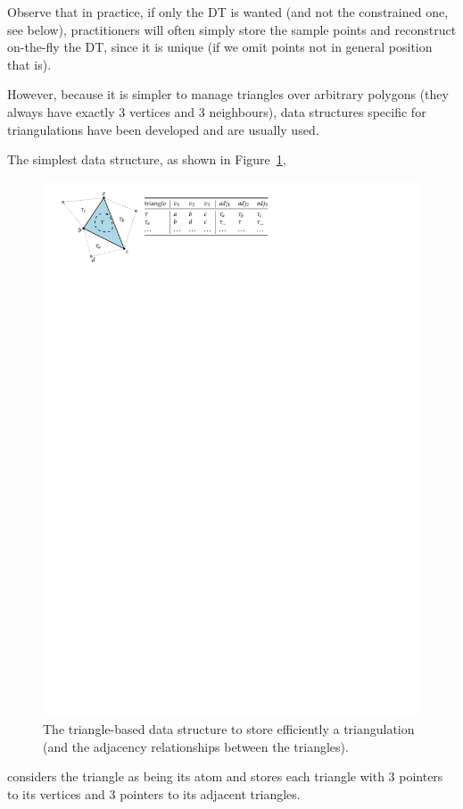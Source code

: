 Observe that in practice, if only the DT is wanted (and not the constrained one, see below), practitioners will often simply store the sample points and reconstruct on-the-fly the DT, since it is unique (if we omit points not in general position that is).

However, because it is simpler to manage triangles over arbitrary polygons (they always have exactly 3 vertices and 3 neighbours), data structures specific for triangulations have been developed and are usually used.

The simplest data structure, as shown in Figure~\ref{fig:tr_ds}, 
\begin{figure}
  \centering
  \includegraphics[width=0.95\linewidth]{figs/tr_ds}
  \caption{The triangle-based data structure to store efficiently a triangulation (and the adjacency relationships between the triangles).}
\label{fig:tr_ds}
\end{figure}
considers the triangle as being its atom and stores each triangle with 3 pointers to its vertices and 3 pointers to its adjacent triangles. 




